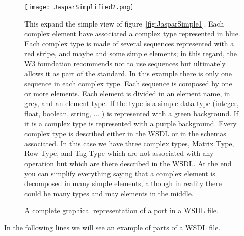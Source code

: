 \documentclass[a4paper,10pt]{article}
\begin{document}
      \begin{figure}[H]
      {\centering \hspace*{-1.0in}
      \texttt{[image: JasparSimplified2.png]}
      \caption{A complete graphical representation of a port in a WSDL file.} \label{fig:JasparSimple2}}
      \medskip
      \small
      This expand the simple view of figure~\ref{fig:JasparSimple1}. Each complex element have associated a complex type represented in blue. Each complex type is made of several sequences represented with a red stripe, and maybe and some simple elements; in this regard, the W3 foundation recommends not to use sequences but ultimately allows it as part of the standard. In this example there is only one sequence in each complex type. Each sequence is composed by one or more elements. Each element is divided in an element name, in grey, and an element type. If the type is a simple data type  (integer, float, boolean, string, ... ) is represented with a green background. If it is a complex type is represented with a purple background. Every complex type is described either in the WSDL or in the schemas associated. In this case we have three complex types, Matrix Type, Row Type, and Tag Type which are not associated with any operation but which are there described in the WSDL. At the end you can simplify everything saying that a complex element is decomposed in many simple elements, although in reality there could be many types and may elements in the middle.
      \end{figure}

    In the following lines we will see an example of parts of a WSDL file.
\end{document}
